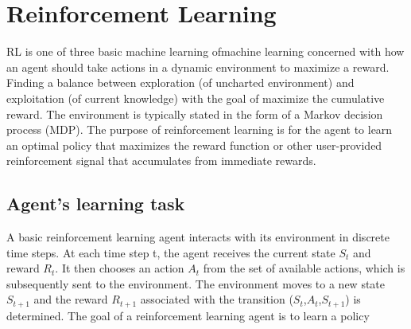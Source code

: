 \chapter{Reinforcement Learning}
RL is one of three basic machine learning ofmachine learning concerned with how an agent should take actions in a dynamic environment to maximize a reward. 
Finding a balance between exploration (of uncharted environment) and exploitation (of current knowledge) with the goal of maximize the cumulative reward. 
The environment is typically stated in the form of a Markov decision process (MDP).
The purpose of reinforcement learning is for the agent to learn an optimal policy that maximizes the reward function or other user-provided reinforcement signal that accumulates from immediate rewards.
\section{Agent's learning task}
A basic reinforcement learning agent interacts with its environment in discrete time steps. 
At each time step t, the agent receives the current state $S_t$ and reward $R_t$. 
It then chooses an action $A_t$ from the set of available actions, which is subsequently sent to the environment. 
The environment moves to a new state $S_{t+1}$ and the reward $R_{t+1}$ 
associated with the transition ($S_t$,$A_t$,$S_{t+1}$) is determined. 
The goal of a reinforcement learning agent is to learn a policy

